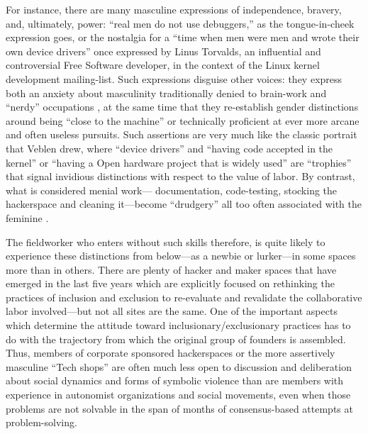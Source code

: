 \documentclass[10pt,letter,oneside]{scrartcl}
\begin{document}
For instance, there are many masculine expressions of independence,
bravery, and, ultimately, power: ``real men do not use debuggers,'' as
the tongue-in-cheek expression goes, or the nostalgia for a ``time when
men were men and wrote their own device drivers'' once expressed by
Linus Torvalds, an influential and controversial Free Software
developer, in the context of the Linux kernel development
mailing-list.  Such expressions disguise other voices: they express
both an anxiety about masculinity traditionally denied to brain-work
and ``nerdy'' occupations \cite{Nugent2008}, at the same time that
they re-establish gender distinctions around being ``close to the
machine'' \cite{Ullman1997} or technically proficient at ever more
arcane and often useless pursuits.  Such assertions are very much like
the classic portrait that Veblen drew, where ``device drivers'' and
``having code accepted in the kernel'' or ``having a Open hardware
project that is widely used'' are ``trophies'' that signal invidious
distinctions with respect to the value of labor.  By contrast, what is
considered menial work--- documentation, code-testing, stocking the
hackerspace and cleaning it---become ``drudgery'' all too often
associated with the feminine \cite{Veblen1934}.

The fieldworker who enters without such skills therefore, is quite
likely to experience these distinctions from below---as a newbie or
lurker---in some spaces more than in others.  There are plenty of
hacker and maker spaces that have emerged in the last five years which
are explicitly focused on rethinking the practices of inclusion and
exclusion to re-evaluate and revalidate the collaborative labor
involved---but not all sites are the same. One of the important
aspects which determine the attitude toward inclusionary/exclusionary
practices has to do with the trajectory from which the original group
of founders is assembled. Thus, members of corporate sponsored
hackerspaces or the more assertively masculine ``Tech shops'' are
often much less open to discussion and deliberation about social
dynamics and forms of symbolic violence than are members with
experience in autonomist organizations and social movements, even when
those problems are not solvable in the span of months of
consensus-based attempts at problem-solving.
\end{document}
